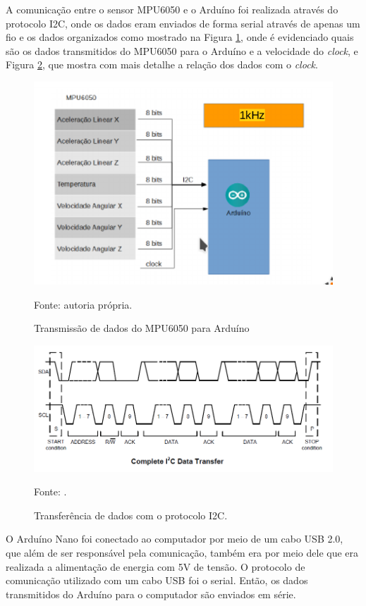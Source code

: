 		A comunicação entre o sensor MPU6050 e o Arduíno foi realizada através do protocolo I2C, onde os dados eram enviados de forma serial através de apenas um fio e os dados organizados como mostrado na Figura \ref{comunicacao}, onde é evidenciado quais são os dados transmitidos do MPU6050 para o Arduíno e a velocidade do \textit{clock}, e Figura \ref{i2c}, que mostra com mais detalhe a relação dos dados com o \textit{clock}.
		
		\begin{figure}[h]
			\centering
			\includegraphics[keepaspectratio=true,scale=1]{figuras/comunicacao.PNG}
			\caption{ Transmissão de dados do MPU6050 para Arduíno}
			Fonte: autoria própria. 
			\label{comunicacao}	
		\end{figure}
		
		\begin{figure}[h]
			\centering
			\includegraphics[keepaspectratio=true,scale=0.5]{figuras/i2c.PNG}
			\caption{Transferência de dados com o protocolo I2C. }
			Fonte: \cite{mpu6050}. 
			\label{i2c}	
		\end{figure}
	
		O Arduíno Nano foi conectado ao computador por meio de um cabo USB 2.0, que além de ser responsável pela comunicação, também era por meio dele que era realizada a alimentação de energia com 5V de tensão. O protocolo de comunicação utilizado com um cabo USB  foi o serial. Então, os dados transmitidos do Arduíno para o computador são enviados em série. 
		
